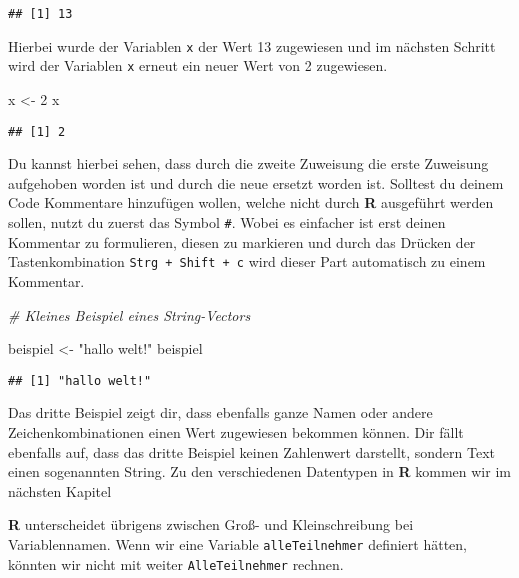 \documentclass[
]{book}
\newenvironment{Shaded}{\begin{snugshade}}{\end{snugshade}}
\newcommand{\CommentTok}[1]{\textcolor[rgb]{0.56,0.35,0.01}{\textit{#1}}}
\newcommand{\DecValTok}[1]{\textcolor[rgb]{0.00,0.00,0.81}{#1}}
\newcommand{\NormalTok}[1]{#1}
\newcommand{\StringTok}[1]{\textcolor[rgb]{0.31,0.60,0.02}{#1}}
\begin{document}
\begin{verbatim}
## [1] 13
\end{verbatim}

Hierbei wurde der Variablen \texttt{x} der Wert 13 zugewiesen und im nächsten Schritt wird der Variablen \texttt{x} erneut ein neuer Wert von 2 zugewiesen.

\begin{Shaded}
\begin{Highlighting}[]
\NormalTok{  x <-}\StringTok{ }\DecValTok{2}
\NormalTok{  x}
\end{Highlighting}
\end{Shaded}

\begin{verbatim}
## [1] 2
\end{verbatim}

Du kannst hierbei sehen, dass durch die zweite Zuweisung die erste Zuweisung aufgehoben worden ist und durch die neue ersetzt worden ist.
Solltest du deinem Code Kommentare hinzufügen wollen, welche nicht durch \textbf{R} ausgeführt werden sollen, nutzt du zuerst das Symbol \texttt{\#}.
Wobei es einfacher ist erst deinen Kommentar zu formulieren, diesen zu markieren und durch das Drücken der Tastenkombination \texttt{Strg\ +\ Shift\ +\ c} wird dieser Part automatisch zu einem Kommentar.

\begin{Shaded}
\begin{Highlighting}[]
\CommentTok{# Kleines Beispiel eines String-Vectors}

\NormalTok{  beispiel <-}\StringTok{ "hallo welt!"}
\NormalTok{  beispiel}
\end{Highlighting}
\end{Shaded}

\begin{verbatim}
## [1] "hallo welt!"
\end{verbatim}

Das dritte Beispiel zeigt dir, dass ebenfalls ganze Namen oder andere Zeichenkombinationen einen Wert zugewiesen bekommen können.
Dir fällt ebenfalls auf, dass das dritte Beispiel keinen Zahlenwert darstellt, sondern Text einen sogenannten String.
Zu den verschiedenen Datentypen in \textbf{R} kommen wir im nächsten Kapitel

\textbf{R} unterscheidet übrigens zwischen Groß- und Kleinschreibung bei Variablennamen.
Wenn wir eine Variable \texttt{alleTeilnehmer} definiert hätten, könnten wir nicht mit weiter \texttt{AlleTeilnehmer} rechnen.
\end{document}
